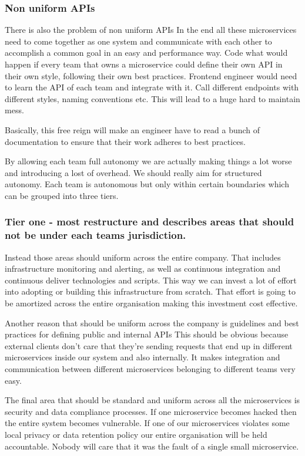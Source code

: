 \subsubsection{Non uniform APIs}
There is also the problem of non uniform APIs
In the end all these microservices need to come together as one system and communicate with each other to accomplish a common goal in an easy and performance way.
Code what would happen if every team that owns a microservice could define their own API in their own style, following their own best practices.
Frontend engineer would need to learn the API of each team and integrate with it.
Call different endpoints with different styles, naming conventions etc.
This will lead to a huge hard to maintain mess.

Basically, this free reign will make an engineer have to read a bunch of documentation to ensure that their work adheres to best practices.

By allowing each team full autonomy we are actually making things a lot worse and introducing a lost of overhead.
We should really aim for structured autonomy.
Each team is autonomous but only within certain boundaries which can be grouped into three tiers.

\subsubsection{Tier one - most restructure and describes areas that should not be under each teams jurisdiction.}
Instead those areas should uniform across the entire company.
That includes infrastructure monitoring and alerting, as well as continuous integration and continuous deliver technologies and scripts.
This way we can invest a lot of effort into adopting or building this infrastructure from scratch.
That effort is going to be amortized across the entire organisation making this investment cost effective.

Another reason that should be uniform across the company is guidelines and best practices for defining public and internal APIs
This should be obvious because external clients don't care that they're sending requests that end up in different microservices inside our system and also internally.
It makes integration and communication between different microservices belonging to different teams very easy.

The final area that should be standard and uniform across all the microservices is security and data compliance processes.
If one microservice becomes hacked then the entire system becomes vulnerable.
If one of our microservices violates some local privacy or data retention policy our entire organisation will be held accountable.
Nobody will care that it was the fault of a single small microservice.

